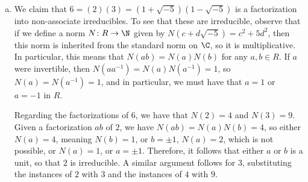 \documentclass[10pt]{mypackage}
\begin{document}
\begin{solution}\hfill
  \begin{enumerate}[(a)]
    \item We claim that $6 = (2)(3) = \left( 1 + \sqrt{-5} \right)\left( 1-\sqrt{-5} \right)$ is a factorization into non-associate irreducibles. To see that these are irreducible, observe that if we define a norm $N\colon R\rightarrow \N$ given by $N\left( c + d\sqrt{-5} \right) = c^2 + 5d^2$, then this norm is inherited from the standard norm on $\C$, so it is multiplicative. In particular, this means that $N(ab) = N(a)N(b)$ for any $a,b\in R$. If $a$ were invertible, then $N\left(aa^{-1}\right) = N(a)N\left( a^{-1} \right) = 1$, so $N(a) = N\left( a^{-1} \right) = 1$, and in particular, we must have that $a = 1$ or $a = -1$ in $R$.

      Regarding the factorizations of $6$, we have that $N(2) = 4$ and $N(3) = 9$. Given a factorization $ab$ of $2$, we have $N(ab) = N(a)N(b) = 4$, so either $N(a) = 4$, meaning $N(b) = 1$, or $b = \pm 1$, $N(a) = 2$, which is not possible, or $N(a) = 1$, or $a = \pm 1$. Therefore, it follows that either $a$ or $b$ is a unit, so that $2$ is irreducible. A similar argument follows for $3$, substituting the instances of $2$ with $3$ and the instances of $4$ with $9$.


\end{enumerate}
\end{solution}
\end{document}

